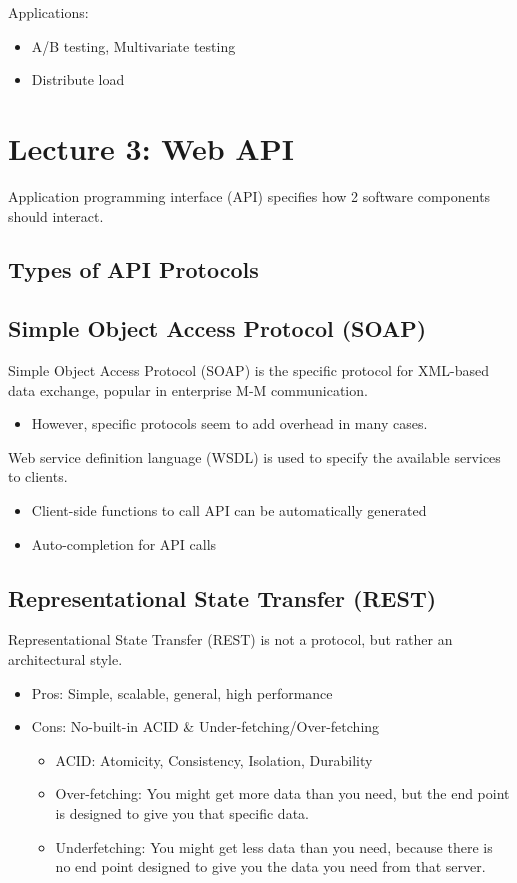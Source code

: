 \documentclass[a4paper]{article}
\begin{document}
\noindent Applications:
\begin{itemize}
    \item A/B testing, Multivariate testing
    \item Distribute load
\end{itemize}

\newpage
\section{Lecture 3: Web API}
Application programming interface (API) specifies how 2 software components should interact.

\subsection*{Types of API Protocols}
\subsection{Simple Object Access Protocol (SOAP)}
Simple Object Access Protocol (SOAP) is the specific protocol for XML-based data exchange, popular in enterprise M-M communication.
\begin{itemize}
    \item However, specific protocols seem to add overhead in many cases.
\end{itemize}
Web service definition language (WSDL) is used to specify the available services to clients.
\begin{itemize}
    \item Client-side functions to call API can be automatically generated
    \item Auto-completion for API calls
\end{itemize}

\subsection{Representational State Transfer (REST)}
Representational State Transfer (REST) is not a protocol, but rather an architectural style.

\begin{itemize}
    \item Pros: Simple, scalable, general, high performance
    \item Cons: No-built-in ACID \& Under-fetching/Over-fetching
    \begin{itemize}[label=$\circ$]
        \item ACID: Atomicity, Consistency, Isolation, Durability
        \item Over-fetching: You might get more data than you need, but the end point is designed to give you that specific data.
        \item Underfetching: You might get less data than you need, because there is no end point designed to give you the data you need from that server.
    \end{itemize}
\end{itemize}
\end{document}
